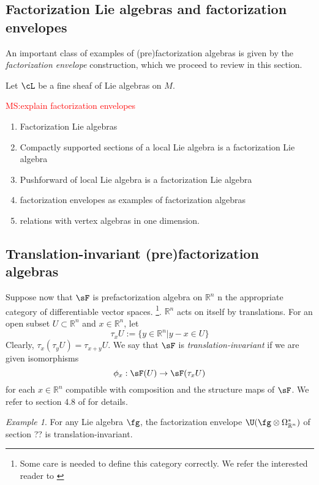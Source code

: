 \documentclass[12pt]{amsart}
\theoremstyle{definition}
\theoremstyle{remark}
\newtheorem{eg}[theorem]{Example}
\def\matt{\textcolor{red}{MS:}\textcolor{red}}
\begin{document}
\subsection{Factorization Lie algebras and factorization envelopes}

An important class of examples of (pre)factorization algebras is given by the \emph{factorization envelope} construction, which we proceed to review in this section.

Let $\cL$ be a fine sheaf of Lie algebras on $M$. 

\matt{explain factorization envelopes}

\begin{enumerate}
\item Factorization Lie algebras
\item Compactly supported sections of a local Lie algebra is a factorization Lie algebra
\item Pushforward of local Lie algebra is a factorization Lie algebra
\item factorization envelopes as examples of factorization algebras
\item relations with vertex algebras in one dimension. 
\end{enumerate}



\subsection{Translation-invariant (pre)factorization algebras}

Suppose now that $\sF$ is prefactorization algebra on $\mathbb{R}^n$ n the appropriate category of
differentiable vector spaces. \footnote{Some care is needed to
  define this category correctly. We refer the interested reader to
  \cite{CG}}. $\mathbb{R}^n$ acts on itself by translations. For an open subset $U \subset \mathbb{R}^n$ and $x \in \mathbb{R}^n$, let 
\[
\tau_x U := \{ y \in \mathbb{R}^n \vert y-x \in U \}
\]
Clearly, $\tau_x (\tau_y U) = \tau_{x+y} U$. We say that $\sF$ is \emph{translation-invariant} if we are given isomorphisms
\[
\phi_x : \sF(U) \rightarrow \sF(\tau_x U)
\]
for each $x \in \mathbb{R}^n$ compatible with composition and the structure maps of $\sF$. We refer to section 4.8 of  \cite{CG} for details. 

\begin{eg}
For any Lie algebra $\fg$, the factorization envelope $\U(\fg \otimes \Omega^*_{\mathbb{R}^n})$ of section ?? is translation-invariant. 
\end{eg}
\end{document}
